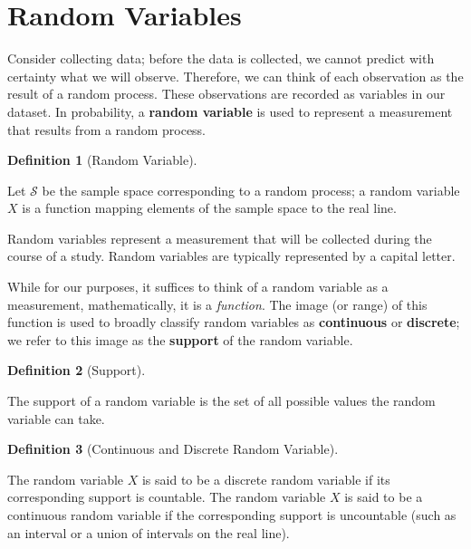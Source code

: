 \documentclass[
  letterpaper,
  DIV=11,
  numbers=noendperiod]{scrreprt}
\theoremstyle{definition}
\newtheorem{definition}{Definition}[chapter]
\theoremstyle{plain}
\theoremstyle{definition}
\theoremstyle{remark}
\begin{document}
\hypertarget{random-variables}{%
\section{Random Variables}\label{random-variables}}

Consider collecting data; before the data is collected, we cannot
predict with certainty what we will observe. Therefore, we can think of
each observation as the result of a random process. These observations
are recorded as variables in our dataset. In probability, a
\textbf{random variable} is used to represent a measurement that results
from a random process.

\begin{definition}[Random
Variable]\protect\hypertarget{def-random-variable}{}\label{def-random-variable}

Let \(\mathcal{S}\) be the sample space corresponding to a random
process; a random variable \(X\) is a function mapping elements of the
sample space to the real line.

Random variables represent a measurement that will be collected during
the course of a study. Random variables are typically represented by a
capital letter.

\end{definition}

While for our purposes, it suffices to think of a random variable as a
measurement, mathematically, it is a \emph{function}. The image (or
range) of this function is used to broadly classify random variables as
\textbf{continuous} or \textbf{discrete}; we refer to this image as the
\textbf{support} of the random variable.

\begin{definition}[Support]\protect\hypertarget{def-support}{}\label{def-support}

The support of a random variable is the set of all possible values the
random variable can take.

\end{definition}

\begin{definition}[Continuous and Discrete Random
Variable]\protect\hypertarget{def-rvtypes}{}\label{def-rvtypes}

The random variable \(X\) is said to be a discrete random variable if
its corresponding support is countable. The random variable \(X\) is
said to be a continuous random variable if the corresponding support is
uncountable (such as an interval or a union of intervals on the real
line).

\end{definition}
\end{document}
